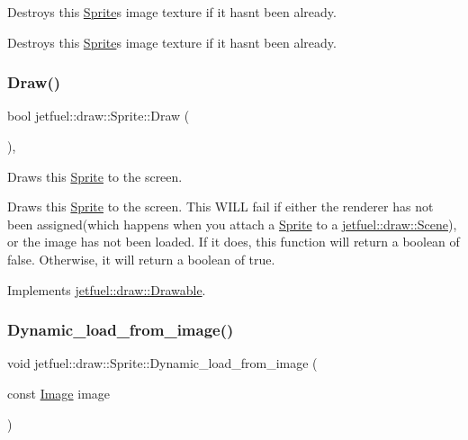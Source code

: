 Destroys this \hyperlink{classjetfuel_1_1draw_1_1Sprite}{Sprite}\textquotesingle{}s image texture if it hasn\textquotesingle{}t been already. 

Destroys this \hyperlink{classjetfuel_1_1draw_1_1Sprite}{Sprite}\textquotesingle{}s image texture if it hasn\textquotesingle{}t been already. \mbox{\label{classjetfuel_1_1draw_1_1Sprite_ae4e52cd12a067e67ed67d5a2a5835143}} 
\subsubsection{\texorpdfstring{Draw()}{Draw()}}
{\footnotesize\ttfamily bool jetfuel\+::draw\+::\+Sprite\+::\+Draw (\begin{DoxyParamCaption}{ }\end{DoxyParamCaption})\hspace{0.3cm}{\ttfamily [override]}, {\ttfamily [virtual]}}



Draws this \hyperlink{classjetfuel_1_1draw_1_1Sprite}{Sprite} to the screen. 

Draws this \hyperlink{classjetfuel_1_1draw_1_1Sprite}{Sprite} to the screen. This W\+I\+LL fail if either the renderer has not been assigned(which happens when you attach a \hyperlink{classjetfuel_1_1draw_1_1Sprite}{Sprite} to a \hyperlink{classjetfuel_1_1draw_1_1Scene}{jetfuel\+::draw\+::\+Scene}), or the image has not been loaded. If it does, this function will return a boolean of false. Otherwise, it will return a boolean of true. 

Implements \hyperlink{classjetfuel_1_1draw_1_1Drawable_a1a072070322965ce9411ee6e7c311c56}{jetfuel\+::draw\+::\+Drawable}.

\mbox{\label{classjetfuel_1_1draw_1_1Sprite_ac7d3ecd6736a3dfb6af35fd099efec8b}} 
\subsubsection{\texorpdfstring{Dynamic\+\_\+load\+\_\+from\+\_\+image()}{Dynamic\_load\_from\_image()}}
{\footnotesize\ttfamily void jetfuel\+::draw\+::\+Sprite\+::\+Dynamic\+\_\+load\+\_\+from\+\_\+image (\begin{DoxyParamCaption}\item[{const \hyperlink{classjetfuel_1_1draw_1_1Image}{Image}}]{image }\end{DoxyParamCaption})}



